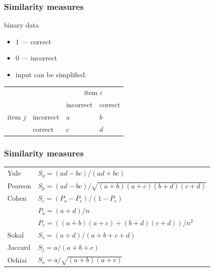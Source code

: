 \documentclass[xcolor=svgnames]{beamer}
\begin{document}
\begin{frame}
    \frametitle{Similarity measures}

    binary data
    \begin{itemize}
        \item $1$ --- correct
        \item $0$ --- incorrect
        \item input can be simplified:
    \end{itemize}

    \vfill

    \centering
    \begin{tabular}{llll}
        \toprule
        & & \multicolumn{2}{c}{item $i$} \\
        & & incorrect & correct \\
        \midrule
        item $j$ & incorrect & $a$ & $b$ \\
        & correct & $c$ & $d$ \\
        \bottomrule
    \end{tabular}
\end{frame}
\begin{frame}
    \frametitle{Similarity measures}

    \begin{center}
        \begin{tabular}{ll}
             Yule & $S_y = (ad-bc) / (ad+bc)$ \\[2mm]
             Pearson  &   $S_p = (ad - bc) /
             \sqrt{(a+b)(a+c)(b+d)(c+d)}$ \\[2mm]
             Cohen &   $S_c = (P_o - P_e) / (1 - P_e)$ \\
             & $ P_o = (a + d) / n$ \\
             & $P_e = ((a+b)(a+c) + (b+d)(c+d)) / n^2$\\[2mm]
             Sokal & $S_s = (a+d) / (a+b+c+d)$ \\[2mm] %
             Jaccard & $S_j = a / (a+b+c)$ \\[2mm]
             Ochiai &  $S_o = a / \sqrt{(a+b)(a+c)}$ \\
        \end{tabular}
    \end{center}
\end{frame}
\end{document}
